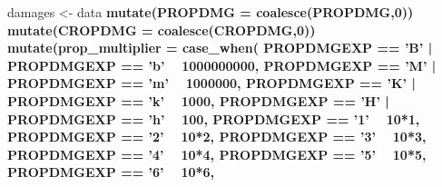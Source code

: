 \documentclass[]{article}
\newenvironment{Shaded}{\begin{snugshade}}{\end{snugshade}}
\newcommand{\KeywordTok}[1]{\textcolor[rgb]{0.13,0.29,0.53}{\textbf{#1}}}
\newcommand{\DataTypeTok}[1]{\textcolor[rgb]{0.13,0.29,0.53}{#1}}
\newcommand{\DecValTok}[1]{\textcolor[rgb]{0.00,0.00,0.81}{#1}}
\newcommand{\StringTok}[1]{\textcolor[rgb]{0.31,0.60,0.02}{#1}}
\newcommand{\OperatorTok}[1]{\textcolor[rgb]{0.81,0.36,0.00}{\textbf{#1}}}
\newcommand{\NormalTok}[1]{#1}
\begin{document}
\begin{Shaded}
\begin{Highlighting}[]
\NormalTok{damages <-}\StringTok{ }
\StringTok{  }\NormalTok{data }\OperatorTok{%>%}\StringTok{ }
\StringTok{      }\KeywordTok{mutate}\NormalTok{(}\DataTypeTok{PROPDMG =} \KeywordTok{coalesce}\NormalTok{(PROPDMG,}\DecValTok{0}\NormalTok{)) }\OperatorTok{%>%}\StringTok{ }
\StringTok{      }\KeywordTok{mutate}\NormalTok{(}\DataTypeTok{CROPDMG =} \KeywordTok{coalesce}\NormalTok{(CROPDMG,}\DecValTok{0}\NormalTok{)) }\OperatorTok{%>%}\StringTok{ }
\StringTok{      }\KeywordTok{mutate}\NormalTok{(}\DataTypeTok{prop_multiplier =} \KeywordTok{case_when}\NormalTok{(}
\NormalTok{                                    PROPDMGEXP }\OperatorTok{==}\StringTok{ 'B'} \OperatorTok{|}\StringTok{ }\NormalTok{PROPDMGEXP }\OperatorTok{==}\StringTok{ 'b'} \OperatorTok{~}\StringTok{ }\DecValTok{1000000000}\NormalTok{,}
\NormalTok{                                    PROPDMGEXP }\OperatorTok{==}\StringTok{ 'M'} \OperatorTok{|}\StringTok{ }\NormalTok{PROPDMGEXP }\OperatorTok{==}\StringTok{ 'm'} \OperatorTok{~}\StringTok{ }\DecValTok{1000000}\NormalTok{,}
\NormalTok{                                    PROPDMGEXP }\OperatorTok{==}\StringTok{ 'K'} \OperatorTok{|}\StringTok{ }\NormalTok{PROPDMGEXP }\OperatorTok{==}\StringTok{ 'k'} \OperatorTok{~}\StringTok{ }\DecValTok{1000}\NormalTok{,}
\NormalTok{                                    PROPDMGEXP }\OperatorTok{==}\StringTok{ 'H'} \OperatorTok{|}\StringTok{ }\NormalTok{PROPDMGEXP }\OperatorTok{==}\StringTok{ 'h'} \OperatorTok{~}\StringTok{ }\DecValTok{100}\NormalTok{,}
\NormalTok{                                    PROPDMGEXP }\OperatorTok{==}\StringTok{ '1'} \OperatorTok{~}\StringTok{ }\DecValTok{10}\OperatorTok{*}\DecValTok{1}\NormalTok{,}
\NormalTok{                                    PROPDMGEXP }\OperatorTok{==}\StringTok{ '2'} \OperatorTok{~}\StringTok{ }\DecValTok{10}\OperatorTok{*}\DecValTok{2}\NormalTok{,}
\NormalTok{                                    PROPDMGEXP }\OperatorTok{==}\StringTok{ '3'} \OperatorTok{~}\StringTok{ }\DecValTok{10}\OperatorTok{*}\DecValTok{3}\NormalTok{,}
\NormalTok{                                    PROPDMGEXP }\OperatorTok{==}\StringTok{ '4'} \OperatorTok{~}\StringTok{ }\DecValTok{10}\OperatorTok{*}\DecValTok{4}\NormalTok{,}
\NormalTok{                                    PROPDMGEXP }\OperatorTok{==}\StringTok{ '5'} \OperatorTok{~}\StringTok{ }\DecValTok{10}\OperatorTok{*}\DecValTok{5}\NormalTok{,}
\NormalTok{                                    PROPDMGEXP }\OperatorTok{==}\StringTok{ '6'} \OperatorTok{~}\StringTok{ }\DecValTok{10}\OperatorTok{*}\DecValTok{6}\NormalTok{,}
}}}
\end{Highlighting}
\end{Shaded}
\end{document}
